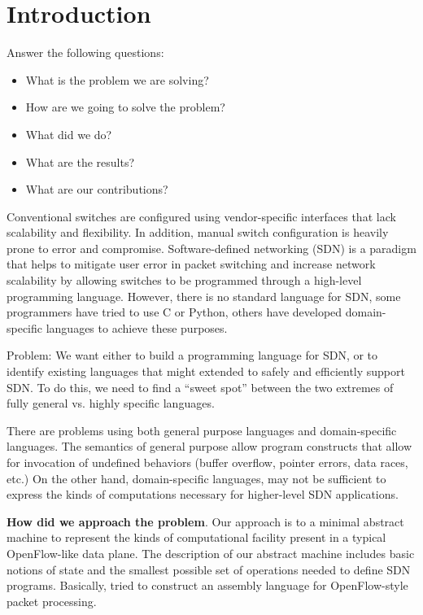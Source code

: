 
\section{Introduction}

Answer the following questions:
\begin{itemize}
\item What is the problem we are solving?
\item How are we going to solve the problem?
\item What did we do?
\item What are the results?
\item What are our contributions?
\end{itemize}

Conventional switches are configured using vendor-specific interfaces that lack scalability and flexibility. In addition, manual switch configuration is heavily prone to error and compromise. Software-defined networking (SDN) is a paradigm that helps to mitigate user error in packet switching and increase network scalability by allowing switches to be programmed through a high-level programming language. However, there is no standard language for SDN, some programmers have tried to use C or Python, others have developed domain-specific languages to achieve these purposes.

Problem: We want either to build a programming language for SDN, or to identify existing languages that might extended to safely and efficiently support SDN.
To do this, we need to find a ``sweet spot'' between the two extremes of fully general vs. highly specific languages.

There are problems using both general purpose languages and domain-specific
languages. 
The semantics of general purpose allow program constructs that
allow for invocation of undefined behaviors (buffer overflow, pointer errors, 
data races, etc.) 
On the other hand, domain-specific languages, may not be sufficient to express the kinds of computations necessary for higher-level SDN applications.

\textbf{How did we approach the problem}.
Our approach is to a minimal abstract machine to represent the kinds of computational facility present in a typical OpenFlow-like data plane.
The description of our abstract machine includes basic notions of state and the smallest possible set of operations needed to define SDN programs.
Basically, tried to construct an assembly language for OpenFlow-style packet processing.

